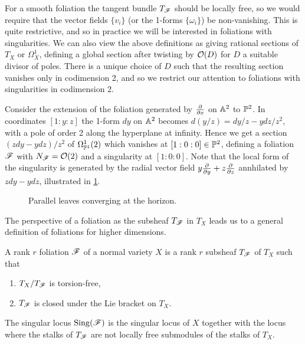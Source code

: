 For a smooth foliation the tangent bundle $T_\scrF$ should be locally free, so
we would require that the vector fields $\{v_i\}$ (or the 1-forms
$\{\omega_i\}$) be non-vanishing. This is quite restrictive, and so in practice
we will be interested in foliations with singularities. We can also view the
above definitions as giving rational sections of $T_X$ or $\Omega^1_X$, defining
a global section after twisting by $\O(D)$ for $D$ a suitable divisor of poles.
There is a unique choice of $D$ such that the resulting section vanishes only in
codimension 2, and so we restrict our attention to foliations with singularities
in codimension 2.

\begin{example}\label{ex:parallel}
    Consider the extension of the foliation generated by $\pdv{}{x}$ on $\A^2$
    to $\P^2$. In coordinates $[1:y:z]$ the 1-form $dy$ on $\A^2$ becomes
    $d(y/z)=dy/z-ydz/z^2$, with a pole of order 2 along the hyperplane at
    infinity. Hence we get a section $(zdy-ydz)/z^2$ of $\Omega^1_{\P^1}(2)$
    which vanishes at $[1:0:0]\in\P^2$, defining a foliation $\scrF$ with
    $N_\scrF=\O(2)$ and a singularity at $[1:0:0]$. Note that the local form of
    the singularity is generated by the radial vector field
    $y\pdv{}{y}+z\pdv{}{z}$ annhilated by $zdy-ydz$, illustrated in
    \cref{fig:parallel}.
    \begin{figure}[H]
        \centering
        \caption{Parallel leaves converging at the horizon.}
        \label{fig:parallel}
    \end{figure}
\end{example}

The perspective of a foliation as the subsheaf $T_\scrF$ in $T_X$ leads us to a
general definition of foliations for higher dimensions.

\begin{definition}\label{defn:foliation}
    A rank $r$ foliation $\scrF$ of a normal variety $X$ is a rank $r$ subsheaf
    $T_\scrF$ of $T_X$ such that
    \begin{enumerate}[label=\roman*.]
        \item $T_X/T_\scrF$ is torsion-free,
        \item $T_\scrF$ is closed under the Lie bracket on $T_X$.
    \end{enumerate}
    The singular locus $\Sing(\scrF)$ is the singular locus of $X$ together with
    the locus where the stalks of $T_\scrF$ are not locally free submodules of
    the stalks of $T_X$.
\end{definition}

